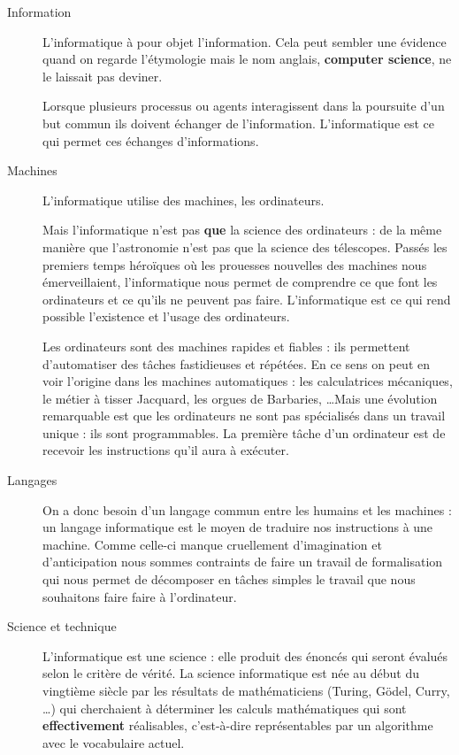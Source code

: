 \begin{description}
\item[Information] 
L'informatique à pour objet l'information. 
Cela peut sembler une évidence quand on regarde l'étymologie mais le nom anglais, {\bf computer science}, ne le laissait pas deviner.

Lorsque plusieurs processus ou agents interagissent dans la poursuite d'un but commun ils doivent échanger de l'information. L'informatique est ce qui permet ces échanges d'informations. 
\item[Machines]
L'informatique utilise des machines, les ordinateurs.

Mais l'informatique n'est pas {\bf que} la science des ordinateurs : de la même manière que l'astronomie n'est pas que la science des télescopes. Passés les premiers temps héroïques où les prouesses nouvelles des machines nous émerveillaient, l'informatique nous permet de comprendre ce que font les ordinateurs et ce qu'ils ne peuvent pas faire. L'informatique est ce qui rend possible l'existence et l'usage des ordinateurs.

Les ordinateurs sont des machines rapides et fiables : ils permettent d'automatiser des tâches fastidieuses et répétées. En ce sens on peut en voir l'origine dans les machines automatiques : les calculatrices mécaniques, le métier à tisser Jacquard, les orgues de Barbaries, \dots Mais une évolution remarquable est que les ordinateurs ne sont pas spécialisés dans un travail unique : ils sont programmables. La première tâche d'un ordinateur est de recevoir les instructions qu'il aura à exécuter.
\item[Langages]
 On a donc besoin d'un langage commun entre les humains et les machines : un langage informatique est le moyen de traduire nos instructions à une machine. Comme celle-ci manque cruellement d'imagination et d'anticipation nous sommes contraints de faire un travail de formalisation qui nous permet de décomposer en tâches simples le travail que nous souhaitons faire faire à l'ordinateur.
\item[Science et technique] 

L'informatique est une science : elle produit des énoncés qui seront évalués selon le critère de vérité.
La science informatique est née au début du vingtième siècle par les résultats de mathématiciens (Turing, Gödel, Curry, \dots) qui cherchaient à déterminer les calculs mathématiques qui sont {\bf effectivement} réalisables, c'est-à-dire représentables par un algorithme avec le vocabulaire actuel.


\end{description}
